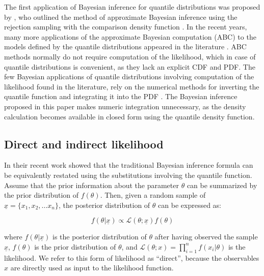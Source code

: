 \documentclass[
  12pt,
]{article}
\begin{document}
The first application of Bayesian inference for quantile distributions was proposed by \citet{parzen2004QuantileProbabilityStatistical}, who outlined the method of approximate Bayesian inference using the rejection sampling with the comparison density function \citep[see sections 21-24 in][]{parzen2004QuantileProbabilityStatistical}. In the recent years, many more applications of the approximate Bayesian computation (ABC) to the models defined by the quantile distributions appeared in the literature \citetext{\citealp{allingham2009BayesianEstimationQuantile}; \citealp{drovandi2011LikelihoodfreeBayesianEstimation}; \citealp{dunson2005ApproximateBayesianInference}; \citealp{mcvinish2012ImprovingABCQuantile}; \citealp[and][]{smithson2017CDFquantileDistributionsModellinga}}. ABC methods normally do not require computation of the likelihood, which in case of quantile distributions is convenient, as they lack an explicit CDF and PDF. The few Bayesian applications of quantile distributions involving computation of the likelihood found in the literature, rely on the numerical methods for inverting the quantile function and integrating it into the PDF \citep{prangle2017GkPackageGandk, bernton2019ApproximateBayesianComputation}. The Bayesian inference proposed in this paper makes numeric integration unnecessary, as the density calculation becomes available in closed form using the quantile density function.

\hypertarget{direct-and-indirect-likelihood}{%
\subsection{Direct and indirect likelihood}\label{direct-and-indirect-likelihood}}

In their recent work \citet{nair2020BayesianInferenceQuantile} showed that the traditional Bayesian inference formula can be equivalently restated using the substitutions involving the quantile function. Assume that the prior information about the parameter \(\theta\) can be summarized by the prior distribution of \(f(\theta)\). Then, given a random sample of \(\underline x=\{x_1, x_2, \dots x_n\}\), the posterior distribution of \(\theta\) can be expressed as:

\[
f(\theta|\underline{x}) \propto \mathcal{L}(\theta;\underline{x})f(\theta)
\label{eq:bayespdfeq}
\]

where \(f(\theta|\underline{x})\) is the posterior distribution of \(\theta\) after having observed the sample \(\underline{x}\), \(f(\theta)\) is the prior distribution of \(\theta\), and \(\mathcal{L}(\theta;x)=\prod_{i=1}^{n}f(x_i|\theta)\) is the likelihood. We refer to this form of likelihood as ``direct'', because the observables \(x\) are directly used as input to the likelihood function.
\end{document}
